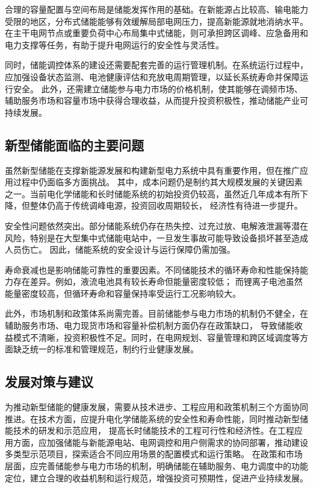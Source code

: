 合理的容量配置与空间布局是储能发挥作用的基础。在新能源占比较高、输电能力受限的地区，分布式储能能够有效缓解局部电网压力，提高新能源就地消纳水平。
在主干电网节点或重要负荷中心布局集中式储能，则可承担跨区调峰、应急备用和电力支撑等任务，有助于提升电网运行的安全性与灵活性。

同时，储能调控体系的建设还需要配套完善的运行管理机制。在系统运行过程中，应加强设备状态监测、电池健康评估和充放电周期管理，以延长系统寿命并保障运行安全。
此外，还需建立储能参与电力市场的价格机制，使其能够在调频市场、辅助服务市场和容量市场中获得合理收益，从而提升投资积极性，推动储能产业可持续发展。


\subsection{新型储能面临的主要问题}

虽然新型储能在支撑新能源发展和构建新型电力系统中具有重要作用，但在推广应用过程中仍面临多方面挑战。
其中，成本问题仍是制约其大规模发展的关键因素之一。当前电化学储能和长时储能系统的初始投资仍较高，虽然近几年成本有所下降，但整体仍高于传统调峰电源，投资回收周期较长，
经济性有待进一步提升。

安全性问题依然突出。部分储能系统仍存在热失控、过充过放、电解液泄漏等潜在风险，特别是在大型集中式储能电站中，一旦发生事故可能导致设备损坏甚至造成人员伤亡。
因此，储能系统的安全设计与运行保障仍需加强。

寿命衰减也是影响储能可靠性的重要因素。不同储能技术的循环寿命和性能保持能力存在差异。例如，液流电池具有较长寿命但能量密度较低；
而锂离子电池虽然能量密度较高，但循环寿命和容量保持率受运行工况影响较大。

此外，市场机制和政策体系尚需完善。目前储能参与电力市场的机制仍不健全，在辅助服务市场、电力现货市场和容量补偿机制方面仍存在政策缺口，
导致储能收益模式不清晰，投资积极性不足。同时，在电网规划、容量管理和跨区域调度等方面缺乏统一的标准和管理规范，制约行业健康发展。

\subsection{发展对策与建议}

为推动新型储能的健康发展，需要从技术进步、工程应用和政策机制三个方面协同推进。在技术方面，应提升电化学储能系统的安全性和寿命性能，同时推动新型储能技术的研发和示范应用，
提高长时储能技术的工程可行性和经济性。在工程应用方面，应加强储能与新能源电站、电网调控和用户侧需求的协同部署，推动建设多类型示范项目，探索适合不同应用场景的配置模式和运行策略。
在政策和市场层面，应完善储能参与电力市场的机制，明确储能在辅助服务、电力调度中的功能定位，建立合理的收益机制和运行规范，增强投资可预期性，促进产业持续发展。